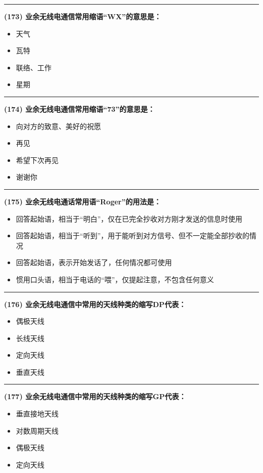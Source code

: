 \documentclass[twocolumn]{ctexart}  %
\begin{document}
\noindent\rule{0.5\textwidth}{1pt}
\heiti \textbf{(173) 业余无线电通信常用缩语“WX”的意思是：} \songti {\color{gray} [LK0396] }
\begin{itemize}
	\item  天气
	\item  瓦特
	\item  联络、工作
	\item  星期
\end{itemize}


\noindent\rule{0.5\textwidth}{1pt}
\heiti \textbf{(174) 业余无线电通信常用缩语“73”的意思是：} \songti {\color{gray} [LK0402] }
\begin{itemize}
	\item  向对方的致意、美好的祝愿
	\item  再见
	\item  希望下次再见
	\item  谢谢你
\end{itemize}


\noindent\rule{0.5\textwidth}{1pt}
\heiti \textbf{(175) 业余无线电通话常用语“Roger”的用法是：} \songti {\color{gray} [LK0404] }
\begin{itemize}
	\item  回答起始语，相当于“明白”，仅在已完全抄收对方刚才发送的信息时使用
	\item  回答起始语，相当于“听到”，用于能听到对方信号、但不一定能全部抄收的情况
	\item  回答起始语，表示开始发话了，任何情况都可使用
	\item  惯用口头语，相当于电话的“喂”，仅提起注意，不包含任何意义
\end{itemize}


\noindent\rule{0.5\textwidth}{1pt}
\heiti \textbf{(176) 业余无线电通信中常用的天线种类的缩写DP代表：} \songti {\color{gray} [LK0405] }
\begin{itemize}
	\item  偶极天线
	\item  长线天线
	\item  定向天线
	\item  垂直天线
\end{itemize}


\noindent\rule{0.5\textwidth}{1pt}
\heiti \textbf{(177) 业余无线电通信中常用的天线种类的缩写GP代表：} \songti {\color{gray} [LK0407] }
\begin{itemize}
	\item  垂直接地天线
	\item  对数周期天线
	\item  偶极天线
	\item  定向天线
\end{itemize}
\end{document}
